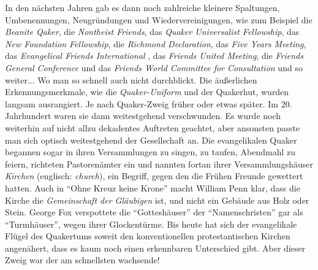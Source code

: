 In den nächsten Jahren gab es dann noch zahlreiche kleinere Spaltungen,
Umbenennungen, Neugründungen und Wiedervereinigungen, wie zum Beispiel die
\textit{Beanite Qaker}, die \textit{Nontheist
Friends}, das \textit{Quaker Universalist
Fellowship}, das \textit{New
Foundation Fellowship}, die
\textit{Richmond Declaration}, das \textit{Five
Years Meeting}, das \textit{Evangelical Friends International}
, das \textit{Friends United
Meeting}, die \textit{Friends General
Conference} und das \textit{Friends
World Committee for Consultation} und so weiter... Wo man so schnell auch nicht
durchblickt.
Die äußerlichen Erkennungsmerkmale, wie die \textit{Quaker-Uniform}
 und der Quakerhut, wurden
langsam ausrangiert. Je nach Quaker-Zweig früher oder etwas später. Im 20.
Jahrhundert waren sie dann weitestgehend verschwunden. Es wurde noch weiterhin
auf
nicht allzu dekadentes Auftreten geachtet, aber ansonsten passte man sich
optisch weitestgehend der Gesellschaft an. Die evangelikalen Quaker begannen
sogar in ihren Versammlungen zu singen, zu taufen, Abendmahl zu feiern,
richteten Pastorenämter ein und nannten
fortan ihrer Versammlungshäuser \textit{Kirchen}
(englisch: \textit{church}),
ein Begriff, gegen den die Frühen Freunde gewettert hatten. Auch in "`Ohne Kreuz
keine Krone"' macht William Penn klar, dass die Kirche die \textit{Gemeinschaft
der
Gläubigen} ist, und nicht ein Gebäude aus Holz oder Stein. George Fox
verspottete
die "`Gotteshäuser"' der "`Namenschristen"' gar als
"`Turmhäuser"', wegen ihrer
Glockentürme. Bis heute hat sich der evangelikale Flügel des Quakertums soweit
den konventionellen protestantischen Kirchen angenähert, dass es kaum noch
einen
erkennbaren Unterschied gibt. Aber dieser Zweig war der am schnellsten
wachsende!

\medskip

